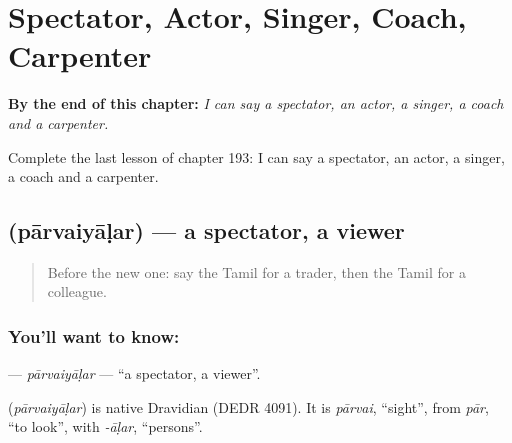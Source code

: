 
\chapter{Spectator, Actor, Singer, Coach, Carpenter}
\label{ch:ta-spectator-actor-singer-coach-carpenter}

\begin{chapteropening}
\textbf{By the end of this chapter:} \emph{I can say a spectator, an actor, a singer, a coach and a carpenter.}

Complete the last lesson of chapter 193: I can say a spectator, an actor, a singer, a coach and a carpenter.
\end{chapteropening}

\section[\texorpdfstring{\ta{பார்வையாளர்} (pārvaiyāḷar)}{பார்வையாளர் (pārvaiyāḷar)}]{ (pārvaiyāḷar) — a spectator, a viewer}

\label{lesson:TA-C193-parvaiyalar}



\begin{quote}
Before the new one: say the Tamil for a trader, then the Tamil for a colleague.
\end{quote}

\subsection*{You'll want to know: }
\textbf{} — \emph{pārvaiyāḷar} — \textquotedblleft{}a spectator, a viewer\textquotedblright{}.

\begin{cousinweb}
\textbf{} (\emph{pārvaiyāḷar}) is native Dravidian (DEDR 4091). It is \emph{pārvai}, \textquotedblleft{}sight\textquotedblright{}, from \emph{pār}, \textquotedblleft{}to look\textquotedblright{}, with \emph{-āḷar}, \textquotedblleft{}persons\textquotedblright{}.
\end{cousinweb}

